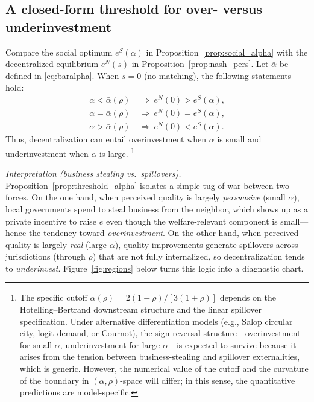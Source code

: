\subsection{A closed-form threshold for over- versus underinvestment}
\begin{proposition}\label{prop:threshold_alpha}
Compare the social optimum $e^{S}(\alpha)$ in Proposition~\ref{prop:social_alpha} with the decentralized equilibrium $e^{N}(s)$ in Proposition~\ref{prop:nash_pers}. Let $\bar\alpha$ be defined in \eqref{eq:baralpha}. When $s=0$ (no matching), the following statements hold:
\begin{equation*}
\begin{aligned}
\alpha<\bar\alpha(\rho) \ &\Rightarrow\ e^{N}(0)>e^{S}(\alpha),\\
\alpha=\bar\alpha(\rho) \ &\Rightarrow\ e^{N}(0)=e^{S}(\alpha),\\
\alpha>\bar\alpha(\rho) \ &\Rightarrow\ e^{N}(0)<e^{S}(\alpha).
\end{aligned}
\end{equation*}
Thus, decentralization can entail overinvestment when $\alpha$ is small and underinvestment when $\alpha$ is large.%
\footnote{The specific cutoff $\bar\alpha(\rho)=2(1-\rho)/[3(1+\rho)]$ depends on the Hotelling--Bertrand downstream structure and the linear spillover specification.  Under alternative differentiation models (e.g., Salop circular city, logit demand, or Cournot), the sign-reversal structure---overinvestment for small $\alpha$, underinvestment for large $\alpha$---is expected to survive because it arises from the tension between business-stealing and spillover externalities, which is generic. However, the numerical value of the cutoff and the curvature of the boundary in $(\alpha,\rho)$-space will differ; in this sense, the quantitative predictions are model-specific.}
\end{proposition}

\noindent\textit{Interpretation (business stealing vs.\ spillovers).}
Proposition~\ref{prop:threshold_alpha} isolates a simple tug-of-war between two forces.
On the one hand, when perceived quality is largely \emph{persuasive} (small $\alpha$), local governments spend to steal business from the neighbor, which shows up as a private incentive to raise $e$ even though the welfare-relevant component is small---hence the tendency toward \emph{overinvestment}.
On the other hand, when perceived quality is largely \emph{real} (large $\alpha$), quality improvements generate spillovers across jurisdictions (through $\rho$) that are not fully internalized, so decentralization tends to \emph{underinvest}.
Figure~\ref{fig:regions} below turns this logic into a diagnostic chart.

